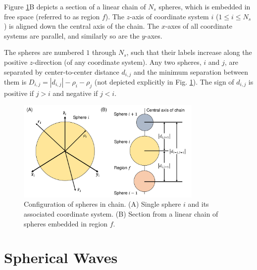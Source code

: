 Figure \ref{fig:Chain_Geometry}B depicts a section of a linear chain of $N_{s}$ spheres, which is embedded in free space (referred to as region $f$). The $z$-axis of coordinate system $i$ ($1 \le i \le N_{s}$) is aligned down the central axis of the chain. The $x$-axes of all coordinate systems are parallel, and similarly so are the $y$-axes.

The spheres are numbered $1$ through $N_{s}$, such that their labels increase along the positive $z$-direction (of any coordinate system). Any two spheres, $i$ and $j$, are separated by center-to-center distance $d_{i,j}$ and the minimum separation between them is $D_{i,j} = | d_{i,j} | - \rho_{i} - \rho_{j}$ (not depicted explicitly in Fig. \ref{fig:Chain_Geometry}). The sign of $d_{i,j}$ is positive if $j > i$ and negative if $j < i$.

\begin{figure}
\centering
\includegraphics[width=0.8\textwidth]{./Figures/Chain_Geometry.pdf}
\caption{\label{fig:Chain_Geometry}Configuration of spheres in chain. (A) Single sphere $i$ and its associated coordinate system. (B) Section from a linear chain of spheres embedded in region $f$.}
\end{figure}


\section{Spherical Waves}


